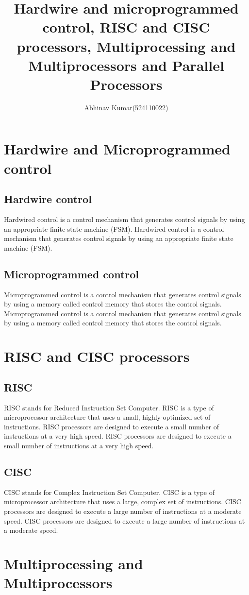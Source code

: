 \documentclass{article}
\title{Hardwire and microprogrammed control, RISC and CISC processors, Multiprocessing and Multiprocessors and Parallel Processors}
\author{Abhinav Kumar(524110022)}
\begin{document}
\Large
\maketitle
\newpage
\section*{Hardwire and Microprogrammed control}
\subsection*{Hardwire control}
Hardwired control is a control mechanism that generates control signals by using an appropriate finite state machine (FSM). Hardwired control is a control mechanism that generates control signals by using an appropriate finite state machine (FSM).
\subsection*{Microprogrammed control}
Microprogrammed control is a control mechanism that generates control signals by using a memory called control memory that stores the control signals. Microprogrammed control is a control mechanism that generates control signals by using a memory called control memory that stores the control signals.
\section*{RISC and CISC processors}
\subsection*{RISC}
RISC stands for Reduced Instruction Set Computer. RISC is a type of microprocessor architecture that uses a small, highly-optimized set of instructions. RISC processors are designed to execute a small number of instructions at a very high speed. RISC processors are designed to execute a small number of instructions at a very high speed.
\subsection*{CISC}
CISC stands for Complex Instruction Set Computer. CISC is a type of microprocessor architecture that uses a large, complex set of instructions. CISC processors are designed to execute a large number of instructions at a moderate speed. CISC processors are designed to execute a large number of instructions at a moderate speed.
\section*{Multiprocessing and Multiprocessors}
\end{document}

